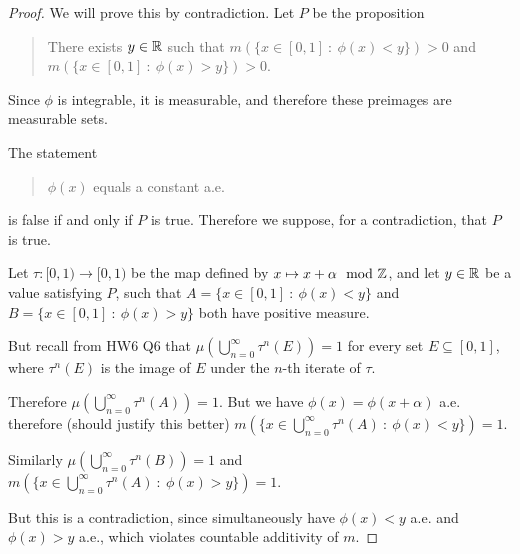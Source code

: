 \begin{proof}
  We will prove this by contradiction. Let $P$ be the proposition
  \begin{quote}
    There exists $y \in \mathbb{R}$ such that $m(\{x \in [0, 1] ~:~ \phi(x) < y\}) > 0$ and $m(\{x \in [0, 1] ~:~ \phi(x) > y\}) > 0$.
  \end{quote}
  Since $\phi$ is integrable, it is measurable, and therefore these preimages are measurable sets.

  The statement
  \begin{quote}
    ​$\phi(x)$ equals a constant a.e.
  \end{quote}
  is false if and only if $P$ is true. Therefore we suppose, for a contradiction, that $P$ is true.

  Let $\tau: [0, 1) \to [0, 1)$ be the map defined by $x \mapsto x + \alpha \mod {\mathbb{Z}}$, and let $y \in \mathbb{R}$ be a
  value satisfying $P$, such that $A = \{x \in [0, 1] ~:~ \phi(x) < y\}$
  and $B = \{x \in [0, 1] ~:~ \phi(x) > y\}$ both have positive measure.

  But recall from HW6 Q6 that $\mu(\bigcup_{n=0}^\infty \tau^n(E)) = 1$ for every set $E \subseteq [0, 1]$,
  where $\tau^n(E)$ is the image of $E$ under the $n$-th iterate of $\tau$.

  Therefore $\mu(\bigcup_{n=0}^\infty \tau^n(A)) = 1$. But we have $\phi(x) = \phi(x + \alpha)$ a.e. therefore
  (should justify this better) $m(\{x \in \bigcup_{n=0}^\infty \tau^n(A) ~:~ \phi(x) < y\}) = 1$.

  Similarly $\mu(\bigcup_{n=0}^\infty \tau^n(B)) = 1$ and $m(\{x \in \bigcup_{n=0}^\infty \tau^n(A) ~:~ \phi(x) > y\}) = 1$.

  But this is a contradiction, since simultaneously have $\phi(x) < y$ a.e. and $\phi(x) > y$ a.e., which
  violates countable additivity of $m$.
\end{proof}







